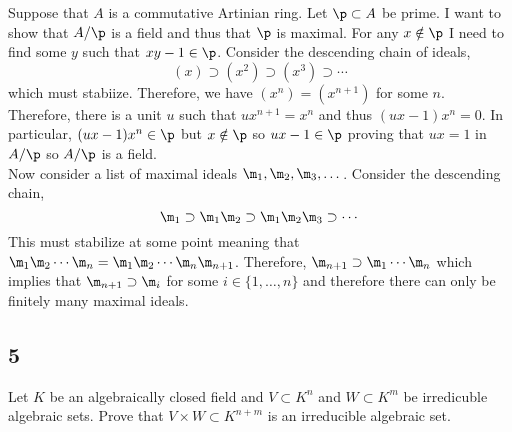 \documentclass[12pt]{article}
\begin{document}
Suppose that $A$ is a commutative Artinian ring. Let $\p \subset A$ be prime. I want to show that $A / \p$ is a field and thus that $\p$ is maximal. For any $x \notin \p$ I need to find some $y$ such that $xy - 1 \in \p$. Consider the descending chain of ideals,
\[ (x) \supset (x^2) \supset (x^3) \supset \cdots \]
which must stabiize. Therefore, we have $(x^n) = (x^{n+1})$ for some $n$. Therefore, there is a unit $u$ such that $u x^{n+1} = x^n$ and thus $(ux - 1) x^n = 0$. In particular, $(ux - 1) x^n \in \p$ but $x \notin \p$ so $ux - 1 \in \p$ proving that $ux = 1$ in $A / \p$ so $A / \p$ is a field.
\bigskip\\
Now consider a list of maximal ideals $\m_1, \m_2, \m_3, \dots$. Consider the descending chain,
\[ \m_1 \supset \m_1 \m_2 \supset \m_1 \m_2 \m_3 \supset \cdots \]
This must stabilize at some point meaning that $\m_1 \m_2 \cdots \m_n = \m_1 \m_2 \cdots \m_n \m_{n+1}$. Therefore, $\m_{n+1} \supset \m_1 \cdots \m_n$ which implies that $\m_{n+1} \supset \m_i$ for some $i \in \{1, \dots, n\}$ and therefore there can only be finitely many maximal ideals. 

\subsection{5}


\begin{exercise}
Let $K$ be an algebraically closed field and $V \subset K^n$ and $W \subset K^m$ be irredicuble algebraic sets. Prove that $V \times W \subset K^{n+m}$ is an irreducible algebraic set.
\end{exercise}
\end{document}
